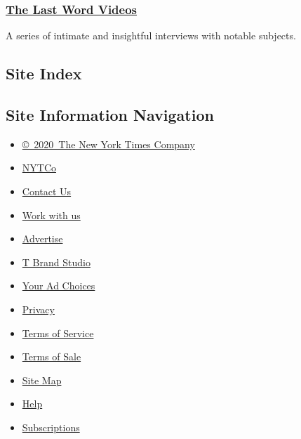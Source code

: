\hypertarget{the-last-word-videos}{%
\subsubsection{\texorpdfstring{\href{https://www.nytimes3xbfgragh.onion/video/last-word}{The
Last Word Videos}}{The Last Word Videos}}\label{the-last-word-videos}}

A series of intimate and insightful interviews with notable subjects.

\hypertarget{site-index}{%
\subsection{Site Index}\label{site-index}}

\hypertarget{site-information-navigation}{%
\subsection{Site Information
Navigation}\label{site-information-navigation}}

\begin{itemize}
\tightlist
\item
  \href{https://help.nytimes3xbfgragh.onion/hc/en-us/articles/115014792127-Copyright-notice}{©~2020~The
  New York Times Company}
\end{itemize}

\begin{itemize}
\tightlist
\item
  \href{https://www.nytco.com/}{NYTCo}
\item
  \href{https://help.nytimes3xbfgragh.onion/hc/en-us/articles/115015385887-Contact-Us}{Contact
  Us}
\item
  \href{https://www.nytco.com/careers/}{Work with us}
\item
  \href{https://nytmediakit.com/}{Advertise}
\item
  \href{http://www.tbrandstudio.com/}{T Brand Studio}
\item
  \href{https://www.nytimes3xbfgragh.onion/privacy/cookie-policy\#how-do-i-manage-trackers}{Your
  Ad Choices}
\item
  \href{https://www.nytimes3xbfgragh.onion/privacy}{Privacy}
\item
  \href{https://help.nytimes3xbfgragh.onion/hc/en-us/articles/115014893428-Terms-of-service}{Terms
  of Service}
\item
  \href{https://help.nytimes3xbfgragh.onion/hc/en-us/articles/115014893968-Terms-of-sale}{Terms
  of Sale}
\item
  \href{https://spiderbites.nytimes3xbfgragh.onion}{Site Map}
\item
  \href{https://help.nytimes3xbfgragh.onion/hc/en-us}{Help}
\item
  \href{https://www.nytimes3xbfgragh.onion/subscription?campaignId=37WXW}{Subscriptions}
\end{itemize}
